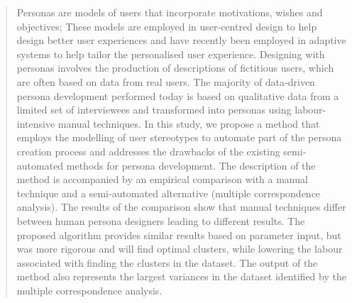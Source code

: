 
\author{Dannie Korsgaard \and Thomas Bj\o rner \and Pernille Krog S\o rensen \and Paolo Burelli
}


\date{Received: date / Accepted: date}


\maketitle

\begin{abstract}
Personas are models of users that incorporate motivations, wishes and objectives; These models are employed in user-centred design to help design better user experiences and have recently been employed in adaptive systems to help tailor the personalised user experience.
Designing with personas involves the production of descriptions of fictitious users, which are often based on data from real users. The majority of data-driven persona development performed today is based on qualitative data from a limited set of interviewees and transformed into personas using labour-intensive manual techniques. In this study, we propose a method that employs the modelling of user stereotypes to automate part of the persona creation process and addresses the drawbacks of the existing semi-automated methods for persona development. The description of the method is accompanied by an empirical comparison with a manual technique and a semi-automated alternative (multiple correspondence analysis). The results of the comparison show that manual techniques differ between human persona designers leading to different results. The proposed algorithm provides similar results based on parameter input, but was more rigorous and will find optimal clusters, while lowering the labour associated with finding the clusters in the dataset. The output of the method also represents the largest variances in the dataset identified by the multiple correspondence analysis.

\end{abstract}

